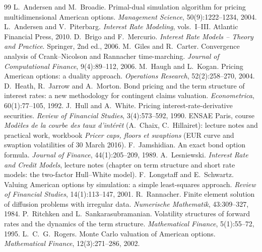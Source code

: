 \documentclass[11pt,a4paper]{article}
\theoremstyle{definition}
\theoremstyle{remark}
\begin{document}
\begin{thebibliography}{99}\small
{} L.~Andersen and M.~Broadie. Primal-dual simulation algorithm for pricing multidimensional American options.
  \emph{Management Science}, 50(9):1222--1234, 2004.
 L.~Andersen and V.~Piterbarg. \emph{Interest Rate Modeling}, vols.~I--III. Atlantic Financial Press, 2010.
 D.~Brigo and F.~Mercurio. \emph{Interest Rate Models -- Theory and Practice}. Springer, 2nd ed., 2006.
 M.~Giles and R.~Carter. Convergence analysis of Crank--Nicolson and Rannacher time-marching.
  \emph{Journal of Computational Finance}, 9(4):89--112, 2006.
 M.~Haugh and L.~Kogan. Pricing American options: a duality approach. \emph{Operations Research}, 52(2):258--270, 2004.
 D.~Heath, R.~Jarrow and A.~Morton. Bond pricing and the term structure of interest rates: a new methodology for
  contingent claims valuation. \emph{Econometrica}, 60(1):77--105, 1992.
 J.~Hull and A.~White. Pricing interest-rate-derivative securities. \emph{Review of Financial Studies}, 3(4):573--592, 1990.
 ENSAE Paris, course \emph{Mod\`eles de la courbe des taux d'int\'er\^et} (A.~Chaix, C.~Hillairet): lecture notes and practical work,
  workbook \emph{Pricer caps, floors et swaptions} (EUR curve and swaption volatilities of 30 March 2016).
 F.~Jamshidian. An exact bond option formula. \emph{Journal of Finance}, 44(1):205--209, 1989.
 A.~Lesniewski. \emph{Interest Rate and Credit Models}, lecture notes (chapter on term structure and short rate models: the two-factor Hull--White model).
 F.~Longstaff and E.~Schwartz. Valuing American options by simulation: a simple least-squares approach.
  \emph{Review of Financial Studies}, 14(1):113--147, 2001.
 R.~Rannacher. Finite element solution of diffusion problems with irregular data. \emph{Numerische Mathematik},
  43:309--327, 1984.
 P.~Ritchken and L.~Sankarasubramanian. Volatility structures of forward rates and the dynamics of the term
  structure. \emph{Mathematical Finance}, 5(1):55--72, 1995.
 L.~C.~G.~Rogers. Monte Carlo valuation of American options. \emph{Mathematical Finance}, 12(3):271--286, 2002.
\end{thebibliography}
\end{document}
